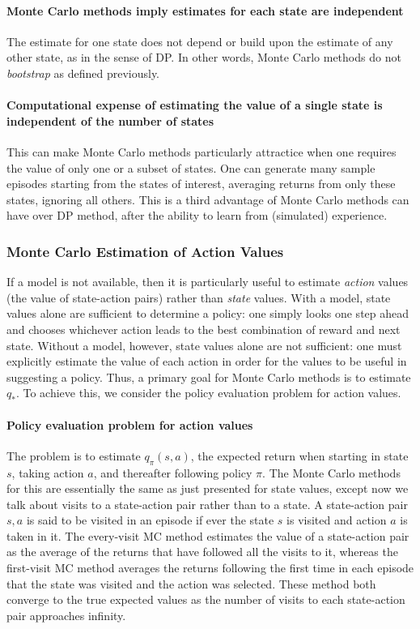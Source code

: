 \documentclass[12pt]{article}
\begin{document}
\paragraph{Monte Carlo methods imply estimates for each state are independent} The estimate for one state does not depend or build upon the estimate of any other state, as in the sense of DP. In other words, Monte Carlo methods do not \emph{bootstrap} as defined previously.

\paragraph{Computational expense of estimating the value of a single state is independent of the number of states} This can make Monte Carlo methods particularly attractice when one requires the value of only one or a subset of states. One can generate many sample episodes starting from the states of interest, averaging returns from only these states, ignoring all others. This is a third advantage of Monte Carlo methods can have over DP method, after the ability to learn from (simulated) experience.

\subsubsection{Monte Carlo Estimation of Action Values}
If a model is not available, then it is particularly useful to estimate \emph{action} values (the value of state-action pairs) rather than \emph{state} values. With a model, state values alone are sufficient to determine a policy: one simply looks one step ahead and chooses whichever action leads to the best combination of reward and next state. Without a model, however, state values alone are not sufficient: one must explicitly estimate the value of each action in order for the values to be useful in suggesting a policy. Thus, a primary goal for Monte Carlo methods is to estimate $q_*$. To achieve this, we consider the policy evaluation problem for action values.

\paragraph{Policy evaluation problem for action values} The problem is to estimate $q_\pi(s,a)$, the expected return when starting in state $s$, taking action $a$, and thereafter following policy $\pi$. The Monte Carlo methods for this are essentially the same as just presented for state values, except now we talk about visits to a state-action pair rather than to a state. A state-action pair $s,a$ is said to be visited in an episode if ever the state $s$ is visited and action $a$ is taken in it. The every-visit MC method estimates the value of a state-action pair as the average of the returns that have followed all the visits to it, whereas the first-visit MC method averages the returns following the first time in each episode that the state was visited and the action was selected. These method both converge to the true expected values as the number of visits to each state-action pair approaches infinity.
\end{document}
